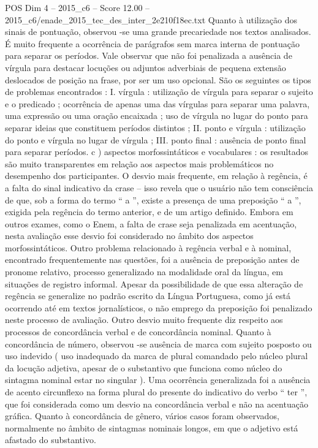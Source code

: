 \begin{textsample}{POS Dim 4 – 2015\_c6 – Score 12.00 – 2015\_c6/enade\_2015\_tec\_des\_inter\_2e210f18ec.txt}
Quanto à utilização dos sinais de pontuação, observou -se uma grande precariedade nos textos analisados.
É muito frequente a ocorrência de parágrafos sem marca interna de pontuação para separar os períodos.
Vale observar que não foi penalizada a ausência de vírgula para destacar locuções ou adjuntos adverbiais de pequena extensão deslocados de posição na frase, por ser um uso opcional.
São os seguintes os tipos de problemas encontrados : I. vírgula : utilização de vírgula para separar o sujeito e o predicado ; ocorrência de apenas uma das vírgulas para separar uma palavra, uma expressão ou uma oração encaixada ; uso de vírgula no lugar do ponto para separar ideias que constituem períodos distintos ; II. ponto e vírgula : utilização do ponto e vírgula no lugar de vírgula ; III. ponto final : ausência de ponto final para separar períodos. c ) aspectos morfossintáticos e vocabulares : os resultados são muito transparentes em relação aos aspectos mais problemáticos no desempenho dos participantes.
O desvio mais frequente, em relação à regência, é a falta do sinal indicativo da crase – isso revela que o usuário não tem consciência de que, sob a forma do termo “ a ”, existe a presença de uma preposição “ a ”, exigida pela regência do termo anterior, e de um artigo definido.
Embora em outros exames, como o Enem, a falta de crase seja penalizada em acentuação, nesta avaliação esse desvio foi considerado no âmbito dos aspectos morfossintáticos.
Outro problema relacionado à regência verbal e à nominal, encontrado frequentemente nas questões, foi a ausência de preposição antes de pronome relativo, processo generalizado na modalidade oral da língua, em situações de registro informal.
Apesar da possibilidade de que essa alteração de regência se generalize no padrão escrito da Língua Portuguesa, como já está ocorrendo até em textos jornalísticos, o não emprego da preposição foi penalizado neste processo de avaliação.
Outro desvio muito frequente diz respeito aos processos de concordância verbal e de concordância nominal.
Quanto à concordância de número, observou -se ausência de marca com sujeito posposto ou uso indevido ( uso inadequado da marca de plural comandado pelo núcleo plural da locução adjetiva, apesar de o substantivo que funciona como núcleo do sintagma nominal estar no singular ).
Uma ocorrência generalizada foi a ausência de acento circunflexo na forma plural do presente do indicativo do verbo “ ter ”, que foi considerada como um desvio na concordância verbal e não na acentuação gráfica.
Quanto à concordância de gênero, vários casos foram observados, normalmente no âmbito de sintagmas nominais longos, em que o adjetivo está afastado do substantivo.

\end{textsample}
